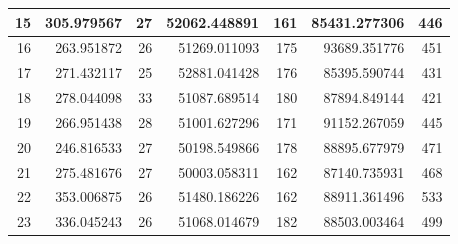\begin{table}
\begin{adjustwidth}{}{}
{{\begin{tabular}{|r|r|r|r|r|r|r|}
\hline
15                                         & 305.979567                   & 27                                    & 52062.448891                   & 161                                   & 85431.277306                 & 446                                    \\ 
\hline
16                                         & 263.951872                   & 26                                    & 51269.011093                   & 175                                   & 93689.351776                 & 451                                    \\ 
\hline
17                                         & 271.432117                   & 25                                    & 52881.041428                   & 176                                   & 85395.590744                 & 431                                    \\ 
\hline
18                                         & 278.044098                   & 33                                    & 51087.689514                   & 180                                   & 87894.849144                 & 421                                    \\ 
\hline
19                                         & 266.951438                   & 28                                    & 51001.627296                   & 171                                   & 91152.267059                 & 445                                    \\ 
\hline
20                                         & 246.816533                   & 27                                    & 50198.549866                   & 178                                   & 88895.677979                 & 471                                    \\ 
\hline
21                                         & 275.481676                   & 27                                    & 50003.058311                   & 162                                   & 87140.735931                 & 468                                    \\ 
\hline
22                                         & 353.006875                   & 26                                    & 51480.186226                   & 162                                   & 88911.361496                 & 533                                    \\ 
\hline
23                                         & 336.045243                   & 26                                    & 51068.014679                   & 182                                   & 88503.003464                 & 499                                    \\ 

\end{tabular}}}
\end{adjustwidth}
\end{table}
